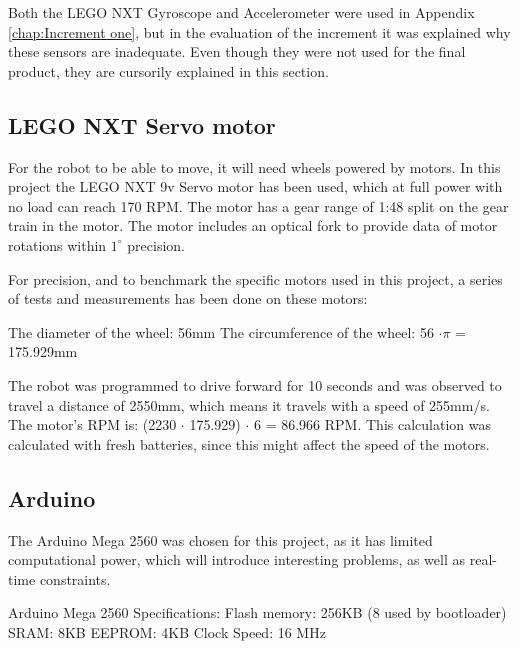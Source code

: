 Both the LEGO NXT Gyroscope and Accelerometer were used in Appendix \ref{chap:Increment one}, but in the evaluation of the increment it was explained why these sensors are inadequate. Even though they were not used for the final product, they are cursorily explained in this section.


\subsection{LEGO NXT Servo motor}
\label{sec:LEGO NXT Servo motor}
For the robot to be able to move, it will need wheels powered by motors. In this project the LEGO NXT 9v Servo motor has been used, which at full power with no load can reach 170 RPM. The motor has a gear range of 1:48 split on the gear train in the motor. \citep{Servo} The motor includes an optical fork to provide data of motor rotations within \(1^{\circ}\) precision.

For precision, and to benchmark the specific motors used in this project, a series of tests and measurements has been done on these motors:

The diameter of the wheel: 56mm \newline
The circumference of the wheel: 56 \begin{math}\cdot \pi \end{math} = 175.929mm

The robot was programmed to drive forward for 10 seconds and was observed to travel a distance of 2550mm, which means it travels with a speed of 255mm/s. \newline
The motor’s RPM is: (2230 \begin{math} \cdot \end{math} 175.929) \begin{math} \cdot \end{math} 6 = 86.966 RPM. 
This calculation was calculated with fresh batteries, since this might affect the speed of the motors.

\subsection{Arduino}
\label{sec:Arduino}
The Arduino Mega 2560 was chosen for this project, as it has limited computational power, which will introduce interesting problems, as well as real-time constraints. 

Arduino Mega 2560 Specifications:\newline
Flash memory: 256KB (8 used by bootloader)\newline
SRAM: 8KB\newline
EEPROM: 4KB\newline
Clock Speed: 16 MHz\newline

